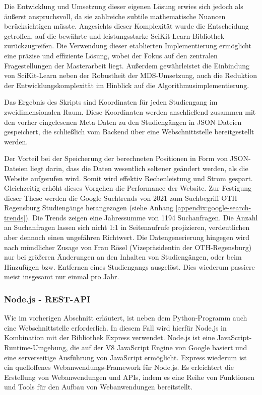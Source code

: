 Die Entwicklung und Umsetzung dieser eigenen Lösung erwies
sich jedoch als äußerst anspruchsvoll, da sie zahlreiche subtile mathematische
Nuancen berücksichtigen müsste. Angesichts dieser Komplexität wurde die
Entscheidung getroffen, auf die bewährte und leistungsstarke
SciKit-Learn-Bibliothek zurückzugreifen. Die Verwendung dieser etablierten
Implementierung ermöglicht eine präzise und effiziente Lösung, wobei der Fokus
auf den zentralen Fragestellungen der Masterarbeit liegt. Außerdem gewährleistet
die Einbindung von SciKit-Learn neben der Robustheit der MDS-Umsetzung, auch die
Reduktion der Entwicklungskomplexität im Hinblick auf die
Algorithmusimplementierung. \parencite{developers_scikit}

Das Ergebnis des Skripts sind Koordinaten für jeden Studiengang im
zweidimensionalen Raum. Diese Koordinaten werden anschließend zusammen mit den
vorher eingelesenen Meta-Daten zu den Studiengängen in JSON-Dateien gespeichert,
die schließlich vom Backend über eine Webschnittstelle bereitgestellt werden.

Der Vorteil bei der Speicherung der berechneten Positionen in Form von
JSON-Dateien liegt darin, dass die Daten wesentlich seltener geändert werden,
als die Website aufgerufen wird. Somit wird effektiv Rechenleistung und Strom
gespart. Gleichzeitig erhöht
dieses Vorgehen die Performance der Website. Zur Festigung dieser These werden
die Google Suchtrends von 2021 zum Suchbegriff \glqq OTH Regensburg
Studiengänge\grqq{} herangezogen (siehe Anhang
\ref{appendix:google-search-trends}). Die Trends zeigen eine Jahressumme von
1194 Suchanfragen. Die Anzahl an Suchanfragen lassen sich nicht 1:1 in
Seitenaufrufe projizieren, verdeutlichen aber dennoch einen ungefähren
Richtwert. Die Datengenerierung hingegen wird nach mündlicher Zusage von
Frau Rösel (Vizepräsidentin der OTH-Regensburg) nur bei größeren Änderungen an den
Inhalten von Studiengängen, oder beim Hinzufügen bzw. Entfernen eines 
Studiengangs ausgelöst. Dies wiederum passiere meist insgesamt nur einmal pro
Jahr.

\subsubsection{Node.js - REST-API}\label{sec:node-js-restapi}
Wie im vorherigen Abschnitt erläutert, ist neben dem Python-Programm auch eine Webschnittstelle erforderlich. In diesem Fall wird hierfür Node.js in Kombination mit der Bibliothek Express verwendet. Node.js ist eine JavaScript-Runtime-Umgebung, die auf der V8 JavaScript Engine von Google basiert und eine serverseitige Ausführung von JavaScript ermöglicht. \parencite{foundation_nodejs_2023} Express wiederum ist ein quelloffenes Webanwendungs-Framework für Node.js. Es erleichtert die Erstellung von Webanwendungen und APIs, indem es eine Reihe von Funktionen und Tools für den Aufbau von Webanwendungen bereitstellt.
\parencite{foundation_express_2023}

